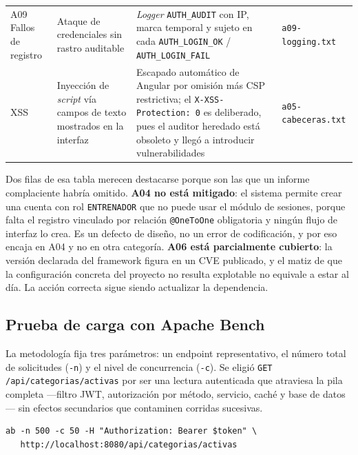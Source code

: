 \documentclass[12pt,a4paper]{article}
\begin{document}
\begin{table}[h!]
\begin{tabularx}{\linewidth}{@{}L{2.3cm}L{3.6cm}L{4.4cm}L{3.1cm}@{}}
    A09 Fallos de registro &
      Ataque de credenciales sin rastro auditable &
      \textit{Logger} \texttt{AUTH\_AUDIT} con IP, marca temporal y sujeto en cada
      \texttt{AUTH\_LOGIN\_OK} / \texttt{AUTH\_LOGIN\_FAIL} &
      \texttt{a09-logging.txt} \\[3pt]
    XSS &
      Inyección de \textit{script} vía campos de texto mostrados en la interfaz &
      Escapado automático de Angular por omisión más CSP restrictiva; el
      \texttt{X-XSS-Protection: 0} es deliberado, pues el auditor heredado está obsoleto y
      llegó a introducir vulnerabilidades &
      \texttt{a05-cabeceras.txt} \\
    \bottomrule
  \end{tabularx}
\end{table}

Dos filas de esa tabla merecen destacarse porque son las que un informe complaciente habría
omitido. \textbf{A04 no está mitigado}: el sistema permite crear una cuenta con rol
\texttt{ENTRENADOR} que no puede usar el módulo de sesiones, porque falta el registro vinculado
por relación \texttt{@OneToOne} obligatoria y ningún flujo de interfaz lo crea. Es un defecto de
diseño, no un error de codificación, y por eso encaja en A04 y no en otra categoría.
\textbf{A06 está parcialmente cubierto}: la versión declarada del framework figura en un CVE
publicado, y el matiz de que la configuración concreta del proyecto no resulta explotable no
equivale a estar al día. La acción correcta sigue siendo actualizar la dependencia.

\subsection{Prueba de carga con Apache Bench}

La metodología fija tres parámetros: un endpoint representativo, el número total de solicitudes
(\texttt{-n}) y el nivel de concurrencia (\texttt{-c}). Se eligió
\texttt{GET /api/categorias/activas} por ser una lectura autenticada que atraviesa la pila
completa ---filtro JWT, autorización por método, servicio, caché y base de datos--- sin efectos
secundarios que contaminen corridas sucesivas.

\begin{lstlisting}[style=bash, caption={Comando ejecutado}]
ab -n 500 -c 50 -H "Authorization: Bearer $token" \
   http://localhost:8080/api/categorias/activas
\end{lstlisting}
\end{document}
